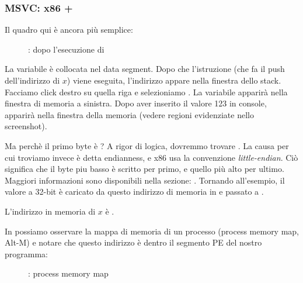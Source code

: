 \clearpage
\subsubsection{MSVC: x86 + \olly}
\myindex{\olly}

Il quadro qui è ancora più semplice:

\begin{figure}[H]
\centering
{}
\caption{\olly: dopo l'esecuzione di \scanf}
\label{fig:scanf_ex2_olly_1}
\end{figure}

La variabile è collocata nel data segment.
Dopo che l'istruzione \PUSH (che fa il push dell'indirizzo di $x$) viene eseguita, 
l'indirizzo appare nella finestra dello stack. Facciamo click destro su quella riga e selezioniamo .
La variabile apparirà nella finestra di memoria a sinistra.
Dopo aver inserito il valore 123 in console, 
 apparirà nella finestra della memoria (vedere regioni evidenziate nello screenshot).

Ma perchè il primo byte è ?
A rigor di logica, dovremmo trovare .
La causa per cui troviamo invece  è detta \gls{endianness}, e x86 usa la convenzione \emph{little-endian}.
Ciò significa che il byte piu basso è scritto per primo, e quello più alto per ultimo.
Maggiori informazioni sono disponibili nella sezione: .
Tornando all'esempio, il valore a 32-bit è caricato da questo indirizzo di memoria in \EAX e passato a \printf.

L'indirizzo in memoria di $x$ è .

\clearpage
\label{olly_memory_map_example}

In \olly possiamo osservare la mappa di memoria di un processo  (process memory map, Alt-M)
e notare che questo indirizzo è dentro il segmento PE  del nostro programma:

\begin{figure}[H]
\centering
{}
\caption{\olly: process memory map}
\label{fig:scanf_ex2_olly_2}
\end{figure}

